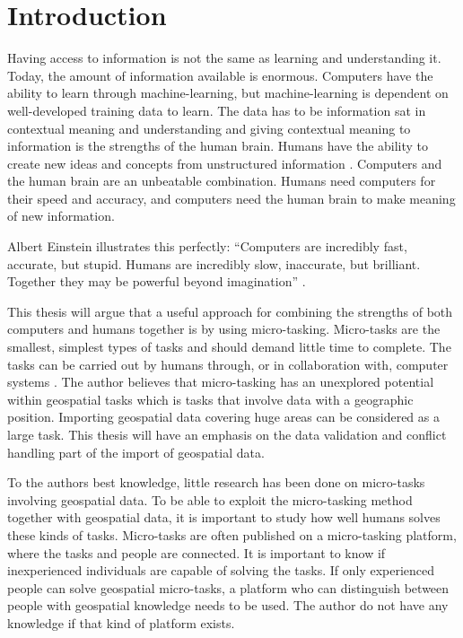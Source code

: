 \chapter{Introduction}
Having access to information is not the same as learning and understanding it. Today, the amount of information available is enormous. Computers have the ability to learn through machine-learning, but machine-learning is dependent on well-developed training data to learn. The data has to be information sat in contextual meaning and understanding and giving contextual meaning to information is the strengths of the human brain. Humans have the ability to create new ideas and concepts from unstructured information \citep{Ross2016}. Computers and the human brain are an unbeatable combination. Humans need computers for their speed and accuracy, and computers need the human brain to make meaning of new information. 

Albert Einstein illustrates this perfectly: “Computers are incredibly fast, accurate, but stupid. Humans are incredibly slow, inaccurate, but brilliant. Together they may be powerful beyond imagination” \citep{Holzinger2013}. 

This thesis will argue that a useful approach for combining the strengths of both computers and humans together is by using micro-tasking. Micro-tasks are the smallest, simplest types of tasks and should demand little time to complete. The tasks can be carried out by humans through, or in collaboration with, computer systems \citep{Yang2016}. The author believes that micro-tasking has an unexplored potential within geospatial tasks which is tasks that involve data with a geographic position. %
Importing geospatial data covering huge areas can be considered as a large task. This thesis will have an emphasis on the data validation and conflict handling part of the import of geospatial data.

To the authors best knowledge, little research has been done on micro-tasks involving geospatial data. To be able to exploit the micro-tasking method together with geospatial data, it is important to study how well humans solves these kinds of tasks. Micro-tasks are often published on a micro-tasking platform, where the tasks and people are connected. It is important to know if inexperienced individuals are capable of solving the tasks. If only experienced people can solve geospatial micro-tasks, a platform who can distinguish between people with geospatial knowledge needs to be used. The author do not have any knowledge if that kind of platform exists. 

